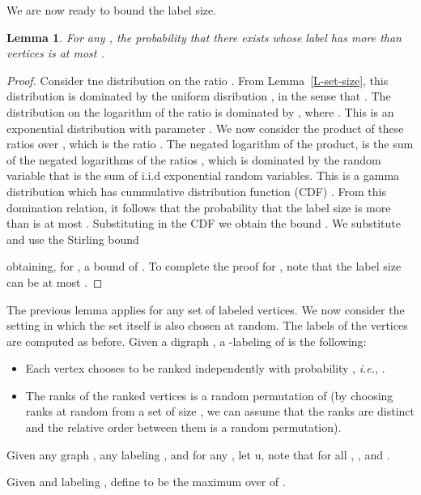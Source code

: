 \documentclass[11pt]{article}
\theoremstyle{plain}
\newtheorem{lem}[thm]{Lemma}
\theoremstyle{definition}
\theoremstyle{remark}
\numberwithin{equation}{section}
\begin{document}
 We are now
ready to bound the label size.

\begin{lem}\label{L-label-size}
For any ,  the probability that there exists  whose
label has more than  vertices is at most 
.
 \end{lem}
\begin{proof}
Consider tne distribution on the ratio .  From
Lemma~\ref{L-set-size}, 
this distribution is
dominated by the uniform disribution , in the sense that
.  The
distribution on the logarithm of the ratio is dominated by  ,
where .  This is an exponential distribution with
parameter .  We now consider the product of these ratios over ,
which is the ratio .
The negated logarithm of the product,   is
the sum of the negated  logarithms of the
ratios  , which is dominated by the random variable  that is the
sum of  i.i.d exponential random variables.  This is a gamma distribution
which has cummulative distribution function (CDF) 
.  From this domination relation, it
follows that the
probability that the label size is more than  is at most 
.  Substituting  in the
CDF  we obtain the bound
.  We substitute   and use the Stirling bound

obtaining, for , a bound of .
To complete the proof for , 
note that the label size can be at most .
\end{proof}



The previous lemma applies for any set  of labeled vertices. We now
consider the setting in which the set  itself is also chosen at
random. The labels of the vertices are computed as before.
 Given a digraph , a -labeling of  is the following:
 \begin{itemize}
 \item Each  vertex chooses to be ranked independently with probability , {\sl i.e.}, .
 \item The ranks of the ranked vertices is a random permutation
  of  (by choosing ranks at random from a set of size , we can assume that the ranks are distinct and the relative order between them is a random permutation).
 \end{itemize}

 Given any graph , any labeling , and for any , let u, note that  for all , , and .

 Given  and labeling , define  to be the maximum over  of .
\end{document}
